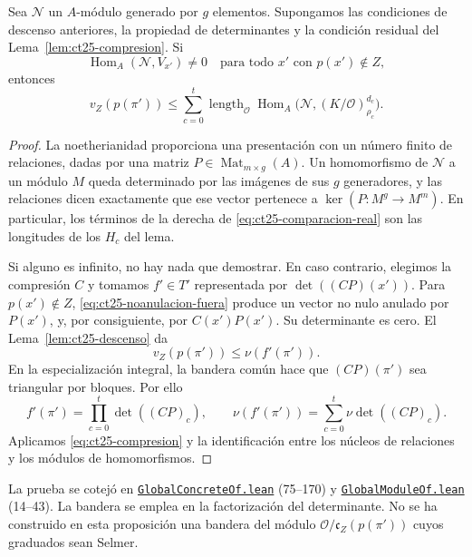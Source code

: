 \begin{proposicion}
\label{prop:ct25-comparacion}
Sea $\mathcal N$ un $A$-módulo generado por $g$ elementos. Supongamos las condiciones de descenso anteriores, la propiedad de determinantes y la condición residual del Lema~\ref{lem:ct25-compresion}. Si
\begin{equation}
 \operatorname{Hom}_A(\mathcal N,V_{x'})\ne0
       \quad\text{para todo }x'\text{ con }p(x')\notin Z,
 \label{eq:ct25-noanulacion-fuera}
\end{equation}
entonces
\begin{equation}
 v_Z(p(\pi'))\le
 \sum_{c=0}^t\operatorname{length}_{\mathcal O}
 \operatorname{Hom}_A\bigl(\mathcal N,(K/\mathcal O)^{d_c}_{\rho_c}\bigr).
 \label{eq:ct25-comparacion-real}
\end{equation}
\end{proposicion}
\begin{proof}
La noetherianidad proporciona una presentación con un número finito de relaciones, dadas por una matriz $P\in\operatorname{Mat}_{m\times g}(A)$. Un homomorfismo de $\mathcal N$ a un módulo $M$ queda determinado por las imágenes de sus $g$ generadores, y las relaciones dicen exactamente que ese vector pertenece a $\ker(P:M^g\to M^m)$. En particular, los términos de la derecha de \eqref{eq:ct25-comparacion-real} son las longitudes de los $H_c$ del lema.

Si alguno es infinito, no hay nada que demostrar. En caso contrario, elegimos la compresión $C$ y tomamos $f'\in T'$ representada por $\det((CP)(x'))$. Para $p(x')\notin Z$, \eqref{eq:ct25-noanulacion-fuera} produce un vector no nulo anulado por $P(x')$, y, por consiguiente, por $C(x')P(x')$. Su determinante es cero. El Lema~\ref{lem:ct25-descenso} da
\[
 v_Z(p(\pi'))\le\nu(f'(\pi')).
\]
En la especialización integral, la bandera común hace que $(CP)(\pi')$ sea triangular por bloques. Por ello
\[
 f'(\pi')=\prod_{c=0}^t\det((CP)_c),\qquad
 \nu(f'(\pi'))=\sum_{c=0}^t\nu\det((CP)_c).
\]
Aplicamos \eqref{eq:ct25-compresion} y la identificación entre los núcleos de relaciones y los módulos de homomorfismos.
\end{proof}

La prueba se cotejó en \href{https://github.com/CocoSgt/riemann-hypothesis-lean/blob/7cbf7a0c32fca1badf05931879a37c3f8a2b03b4/src/Formalism/CharacterColumnKernels/IdempotentNormalForms/GlobalConcreteOf.lean}{\nolinkurl{GlobalConcreteOf.lean}}
(75--170) y \href{https://github.com/CocoSgt/riemann-hypothesis-lean/blob/7cbf7a0c32fca1badf05931879a37c3f8a2b03b4/src/Formalism/CharacterColumnKernels/IdempotentNormalForms/GlobalModuleOf.lean}{\nolinkurl{GlobalModuleOf.lean}} (14--43). La bandera se emplea en la factorización del determinante. No se ha construido en esta proposición una bandera del módulo $\mathcal O/\mathfrak c_Z(p(\pi'))$ cuyos graduados sean Selmer.

